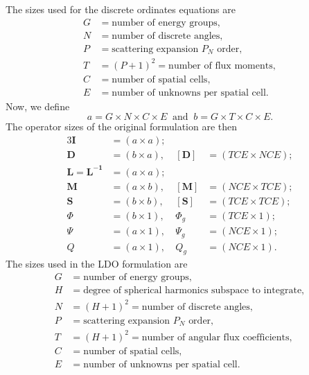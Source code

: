 \documentclass{article} %
\newcommand{\ve}[1]{\ensuremath{\mathbf{#1}}}
\begin{document}
The sizes used for the discrete ordinates equations are
%
\begin{equation*}
  \begin{aligned}
    G &= \text{number of energy groups},\\
    N &= \text{number of discrete angles},\\
    P &= \text{scattering expansion $P_N$ order},\\
    T &= (P+1)^2 = \text{number of flux moments},\\
    C &= \text{number of spatial cells},\\
    E &= \text{number of unknowns per spatial cell}.
  \end{aligned}
\end{equation*}
%
Now, we define
%
\begin{equation}
  a = G \times N \times C \times E\ \text{ and }\
  b = G \times T \times C \times E.
\label{eq:dims}
\end{equation}
%
The operator sizes of the original formulation are then
%
\begin{alignat*}{3}
\ve{I} &= (a \times a);  \\
\ve{D} &= (b \times a),\ &[\ve{D}] &= (TCE \times NCE); \\
\ve{L} = \ve{L^{-1}} &= (a \times a);  \\
\ve{M} &= (a \times b),\ &[\ve{M}] &= (NCE \times TCE); \\
\ve{S} &= (b \times b),\ &[\ve{S}] &= (TCE \times TCE); \\
\Phi &= (b \times 1),\   &\Phi_g   &= (TCE \times 1); \\
\Psi &= (a \times 1),\   &\Psi_g   &= (NCE \times 1); \\
Q &= (a \times 1),\      &Q_g      &= (NCE \times 1).
\end{alignat*}
%
The sizes used in the LDO formulation are
%
\begin{equation*}
  \begin{aligned}
    G &= \text{number of energy groups},\\
    H &= \text{degree of spherical harmonics subspace to integrate},\\
    N &= (H+1)^2 = \text{number of discrete angles},\\
    P &= \text{scattering expansion $P_N$ order},\\
    T &= (H+1)^2 = \text{number of angular flux coefficients},\\
    C &= \text{number of spatial cells},\\
    E &= \text{number of unknowns per spatial cell}.
  \end{aligned}
\end{equation*}
\end{document}
